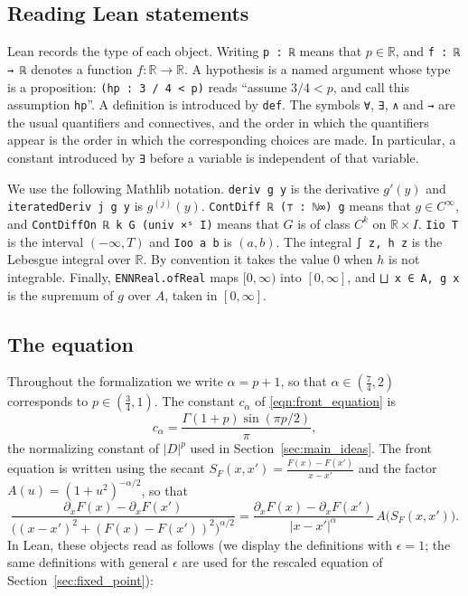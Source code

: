 \documentclass[11pt]{amsart}
\newcommand{\lean}{\lstinline[style=lean]}
\theoremstyle{definition}
\theoremstyle{remark}
\numberwithin{equation}{section}
\begin{document}
\subsection{Reading Lean statements}\label{app:lean-reading}

Lean records the type of each object. Writing \lean{p : ℝ} means that $p\in\mathbb R$, and \lean{f : ℝ → ℝ} denotes a function $f:\mathbb R\to\mathbb R$. A hypothesis is a named argument whose type is a proposition: \lean{(hp : 3 / 4 < p)} reads ``assume $3/4<p$, and call this assumption \lean{hp}''. A definition is introduced by \lean{def}. The symbols \lean{∀}, \lean{∃}, \lean{∧} and \lean{→} are the usual quantifiers and connectives, and the order in which the quantifiers appear is the order in which the corresponding choices are made. In particular, a constant introduced by \lean{∃} before a variable is independent of that variable.

We use the following Mathlib notation. \lean{deriv g y} is the derivative $g'(y)$ and \lean{iteratedDeriv j g y} is $g^{(j)}(y)$. \lean{ContDiff ℝ (⊤ : ℕ∞) g} means that $g\in C^\infty$, and \lean{ContDiffOn ℝ k G (univ ×ˢ I)} means that $G$ is of class $C^k$ on $\mathbb R\times I$. \lean{Iio T} is the interval $(-\infty,T)$ and \lean{Ioo a b} is $(a,b)$. The integral \lean{∫ z, h z} is the Lebesgue integral over $\mathbb R$. By convention it takes the value $0$ when $h$ is not integrable. Finally, \lean{ENNReal.ofReal} maps $[0,\infty)$ into $[0,\infty]$, and \lean{⨆ x ∈ A, g x} is the supremum of $g$ over $A$, taken in $[0,\infty]$.

\subsection{The equation}\label{app:lean-equation}

Throughout the formalization we write $\alpha=p+1$, so that $\alpha\in(\frac74,2)$ corresponds to $p\in(\frac34,1)$. The constant $c_\alpha$ of \eqref{eqn:front_equation} is
\[
 c_\alpha=\frac{\Gamma(1+p)\sin(\pi p/2)}{\pi},
\]
the normalizing constant of $|D|^p$ used in Section~\ref{sec:main_ideas}. The front equation is written using the secant $S_F(x,x')=\frac{F(x)-F(x')}{x-x'}$ and the factor $A(u)=(1+u^2)^{-\alpha/2}$, so that
\[
 \frac{\partial_x F(x)-\partial_x F(x')}{\big((x-x')^2+(F(x)-F(x'))^2\big)^{\alpha/2}}
 =\frac{\partial_x F(x)-\partial_x F(x')}{|x-x'|^{\alpha}}\,A\big(S_F(x,x')\big).
\]
In Lean, these objects read as follows (we display the definitions with $\epsilon=1$; the same definitions with general $\epsilon$ are used for the rescaled equation of Section~\ref{sec:fixed_point}):
\end{document}
